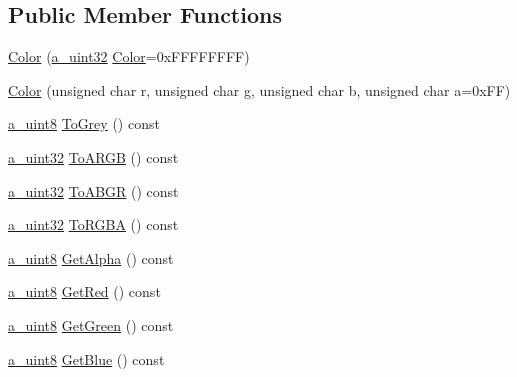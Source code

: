 \subsection*{Public Member Functions}
\begin{DoxyCompactItemize}
\item 
\hyperlink{class_agmd_utilities_1_1_color_add76e123dda461c86f02273c5dbc0ad7}{Color} (\hyperlink{_common_defines_8h_a964296f9770051b9e4807b1f180dd416}{a\+\_\+uint32} \hyperlink{class_agmd_utilities_1_1_color}{Color}=0x\+F\+F\+F\+F\+F\+F\+F\+F)
\item 
\hyperlink{class_agmd_utilities_1_1_color_a2d7867c30d3bd8e7b1e246abfa5910eb}{Color} (unsigned char r, unsigned char \hyperlink{_examples_2_planet_2_app_8cpp_a8cf17d727651616de6f2b79ef32170cd}{g}, unsigned char b, unsigned char a=0x\+F\+F)
\item 
\hyperlink{_common_defines_8h_afbe6c09973474a1f78f870f39073398f}{a\+\_\+uint8} \hyperlink{class_agmd_utilities_1_1_color_a06ab5ab8505f846d62cb141a644dd6b4}{To\+Grey} () const 
\item 
\hyperlink{_common_defines_8h_a964296f9770051b9e4807b1f180dd416}{a\+\_\+uint32} \hyperlink{class_agmd_utilities_1_1_color_a1b1cfdcb5107075b172606e37a469612}{To\+A\+R\+G\+B} () const 
\item 
\hyperlink{_common_defines_8h_a964296f9770051b9e4807b1f180dd416}{a\+\_\+uint32} \hyperlink{class_agmd_utilities_1_1_color_a381deccd825bfb74ca4c99990b95ae7a}{To\+A\+B\+G\+R} () const 
\item 
\hyperlink{_common_defines_8h_a964296f9770051b9e4807b1f180dd416}{a\+\_\+uint32} \hyperlink{class_agmd_utilities_1_1_color_ad7639e01720cacacc7c99553f62f68da}{To\+R\+G\+B\+A} () const 
\item 
\hyperlink{_common_defines_8h_afbe6c09973474a1f78f870f39073398f}{a\+\_\+uint8} \hyperlink{class_agmd_utilities_1_1_color_a12c54bc6449d19f7ab6d2a247587c3df}{Get\+Alpha} () const 
\item 
\hyperlink{_common_defines_8h_afbe6c09973474a1f78f870f39073398f}{a\+\_\+uint8} \hyperlink{class_agmd_utilities_1_1_color_a6ad7d75d50aab670dbf6388f00f5a26b}{Get\+Red} () const 
\item 
\hyperlink{_common_defines_8h_afbe6c09973474a1f78f870f39073398f}{a\+\_\+uint8} \hyperlink{class_agmd_utilities_1_1_color_afaf41195889f84ff2ed965a1314748cc}{Get\+Green} () const 
\item 
\hyperlink{_common_defines_8h_afbe6c09973474a1f78f870f39073398f}{a\+\_\+uint8} \hyperlink{class_agmd_utilities_1_1_color_a2c86522c1722a0061e9145c1203c9db5}{Get\+Blue} () const 

\end{DoxyCompactItemize}
